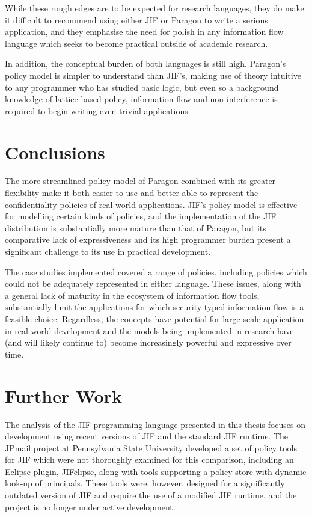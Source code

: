While these rough edges are to be expected for research languages, they do make it difficult to recommend using either JIF or Paragon to write a serious application, and they emphasise the need for polish in any information flow language which seeks to become practical outside of academic research.

In addition, the conceptual burden of both languages is still high. Paragon's policy model is simpler to understand than JIF's, making use of theory intuitive to any programmer who has studied basic logic, but even so a background knowledge of lattice-based policy, information flow and non-interference is required to begin writing even trivial applications.

\section{Conclusions}

The more streamlined policy model of Paragon combined with its greater flexibility make it both easier to use and better able to represent the confidentiality policies of real-world applications. JIF's policy model is effective for modelling certain kinds of policies, and the implementation of the JIF distribution is substantially more mature than that of Paragon, but its comparative lack of expressiveness and its high programmer burden present a significant challenge to its use in practical development.

The case studies implemented covered a range of policies, including policies which could not be adequately represented in either language. These issues, along with a general lack of maturity in the ecosystem of information flow tools, substantially limit the applications for which security typed information flow is a feasible choice. Regardless, the concepts have potential for large scale application in real world development and the models being implemented in research have (and will likely continue to) become increasingly powerful and expressive over time.

\section{Further Work}

The analysis of the JIF programming language presented in this thesis focuses on development using recent versions of JIF and the standard JIF runtime. The JPmail project \cite{jpmailpage} at Pennsylvania State University developed a set of policy tools for JIF which were not thoroughly examined for this comparison, including an Eclipse plugin, JIFclipse, along with tools supporting a policy store with dynamic look-up of principals. These tools were, however, designed for a significantly outdated version of JIF and require the use of a modified JIF runtime, and the project is no longer under active development.

